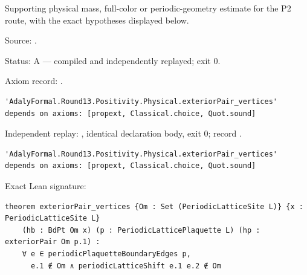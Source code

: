 \begin{theorem}[bp-473]
\label{bp-473}
\leanok
Supporting physical mass, full-color or periodic-geometry estimate for the P2 route, with the exact hypotheses displayed below.

\par Source: \texttt{}.
\par Status: A — compiled and independently replayed; exit 0.
\par Axiom record: \texttt{}.
\begin{verbatim}
'AdalyFormal.Round13.Positivity.Physical.exteriorPair_vertices' depends on axioms: [propext, Classical.choice, Quot.sound]
\end{verbatim}
\par Independent replay: \texttt{}, identical declaration body, exit 0; record \texttt{}.
\begin{verbatim}
'AdalyFormal.Round13.Positivity.Physical.exteriorPair_vertices' depends on axioms: [propext, Classical.choice, Quot.sound]
\end{verbatim}
\par Exact Lean signature:
\begin{verbatim}
theorem exteriorPair_vertices {Om : Set (PeriodicLatticeSite L)} {x : PeriodicLatticeSite L}
    (hb : BdPt Om x) (p : PeriodicLatticePlaquette L) (hp : exteriorPair Om p.1) :
    ∀ e ∈ periodicPlaquetteBoundaryEdges p,
      e.1 ∉ Om ∧ periodicLatticeShift e.1 e.2 ∉ Om
\end{verbatim}
\end{theorem}

